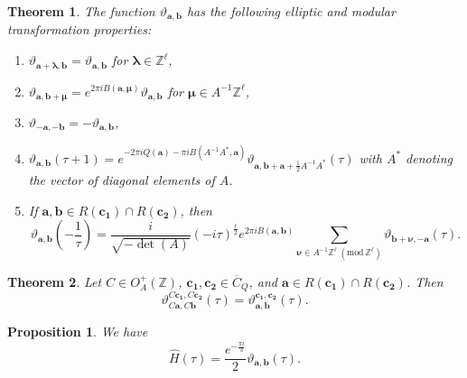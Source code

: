 \documentclass[10pt,a4paper]{amsart}
\newtheorem{theorem}{Theorem}
\newtheorem{proposition}{Proposition}
\renewcommand{\l}{\lambda}
\renewcommand{\pmod}[1]{\ \left( \mathrm{mod} \, #1 \right)}
\renewcommand{\r}{{\rho}}
\renewcommand{\t}{\tau}
\begin{document}
\begin{theorem}\label{Zwmainthm1}
	The function $\vartheta_{\bm{a},\bm{b}}$ has the following elliptic and modular transformation properties:
	\begin{enumerate}
		\item $\vartheta_{\bm{a}+\bm{\l},\bm{b}}=\vartheta_{\bm{a},\bm{b}}$ for $\bm{\l}\in \mathbb{Z}^{\ell}$,
		\item $\vartheta_{\bm{a},\bm{b}+{\bm \mu}}=e^{2\pi iB(\bm{a},\bm{\mu})}\vartheta_{\bm{a},\bm{b}}$ for $\bm{\mu}\in A^{-1}\mathbb{Z}^{\ell}$,
		\item $\vartheta_{-\bm{a},-\bm{b}}=-\vartheta_{\bm{a},\bm{b}}$,
		\item $\vartheta_{\bm{a},\bm{b}}(\t+1)=e^{-2\pi i Q(\bm{a})-\pi i B(A^{-1}A^*,\bm{a})}\vartheta_{\bm{a},\bm{b}+\bm{a}+\frac 12A^{-1}A^{*}}(\t)$ with $A^*$ denoting the vector of diagonal elements of $A$.
		\item If $\bm{a}, \bm{b}\in R(\bm{c_1})\cap R(\bm{c_2})$, then
		\[
		\vartheta_{\bm{a},\bm{b}}\left(-\frac 1\t\right)=\frac{i}{\sqrt{-\det (A)}}\left(-i\t\right)^{\frac{\ell}{2}}e^{2\pi i B(\bm{a},\bm{b})}\sum_{\bm{\nu}\in A^{-1}\mathbb{Z}^{\ell}\pmod{\mathbb{Z}^{\ell}}}\vartheta_{\bm{b}+\bm{\nu},-\bm{a}}(\t).
		\]
	\end{enumerate}
\end{theorem}

\begin{theorem}\label{Zwmainthm2}
	Let $C\in O^{+}_A(\mathbb{Z})$, $\bm{c_1}, \bm{c_2}\in \overline{C}_Q$, and $\bm{a}\in R(\bm{c_1})\cap R(\bm{c_2})$. Then
	\[
	\vartheta^{C\bm{c_1}, C\bm{c_2}}_{C\bm{a},C\bm{b}}(\t)=\vartheta^{\bm{c_1}, \bm{c_2}}_{\bm{a},\bm{b}}(\t).
	\]
\end{theorem}

\begin{proposition}\label{prop1}
We have
\[
\widehat{H}(\t)=\frac{e^{-\frac{\pi i}{3}}}{2}\vartheta_{\bm{a},\bm{b}}(\t).
\]
\end{proposition}
\end{document}
